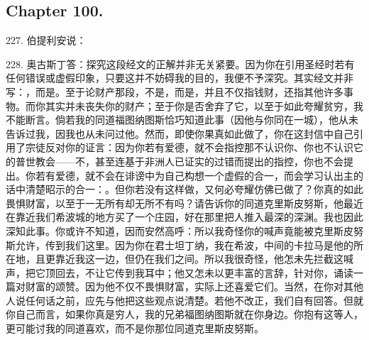 
\subsection{Chapter 100.}

227. 伯提利安说：\par

228. 奥古斯丁答：探究这段经文的正解并非无关紧要。因为你在引用圣经时若有任何错误或虚假印象，只要这并不妨碍我的目的，我便不予深究。其实经文并非写：，而是。至于论财产那段，不是，而是，并且不仅指钱财，还指其他许多事物。而你其实并未丧失你的财产；至于你是否舍弃了它，以至于如此夸耀贫穷，我不能断言。倘若我的同道福图纳图斯恰巧知道此事（因他与你同在一城），他从未告诉过我，因我也从未问过他。然而，即使你果真如此做了，你在这封信中自己引用了宗徒反对你的证言：因为你若有爱德，就不会指控那不认识你、你也不认识它的普世教会——不，甚至连基于非洲人已证实的过错而提出的指控，你也不会提出。你若有爱德，就不会在诽谤中为自己构想一个虚假的合一，而会学习认出主的话中清楚昭示的合一：。但你若没有这样做，又何必夸耀仿佛已做了？你真的如此畏惧财富，以至于一无所有却无所不有吗？请告诉你的同道克里斯皮努斯，他最近在靠近我们希波城的地方买了一个庄园，好在那里把人推入最深的深渊。我也因此深知此事。你或许不知道，因而安然高呼：所以我奇怪你的喊声竟能被克里斯皮努斯允许，传到我们这里。因为你在君士坦丁纳，我在希波，中间的卡拉马是他的所在地，且更靠近我这一边，但仍在我们之间。所以我很奇怪，他怎未先拦截这喊声，把它顶回去，不让它传到我耳中；他又怎未以更丰富的言辞，针对你，诵读一篇对财富的颂赞。因为他不仅不畏惧财富，实际上还喜爱它们。当然，在你对其他人说任何话之前，应先与他把这些观点说清楚。若他不改正，我们自有回答。但就你自己而言，如果你真是穷人，我的兄弟福图纳图斯就在你身边。你抱有这等人，更可能讨我的同道喜欢，而不是你那位同道克里斯皮努斯。\par


